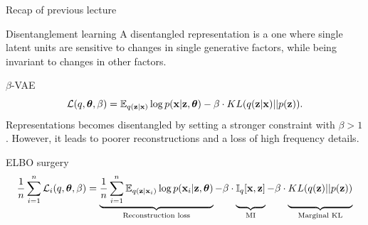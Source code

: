 \begin{frame}{Recap of previous lecture}
	\begin{block}{Disentanglement learning}
	A disentangled representation is a one where single latent units are sensitive to changes in single generative factors, while being invariant to changes in other factors. 
	\end{block}
	\begin{block}{$\beta$-VAE}
	\vspace{-0.2cm}
	\[
	    \mathcal{L}(q, \boldsymbol{\theta}, \beta) = \mathbb{E}_{q(\mathbf{z} | \mathbf{x})} \log p(\mathbf{x} | \mathbf{z}, \boldsymbol{\theta}) - \beta \cdot KL (q(\mathbf{z} | \mathbf{x}) || p(\mathbf{z})).
	\]
	Representations becomes disentangled by setting a stronger constraint with $\beta > 1$. However, it leads to poorer reconstructions and a loss of high frequency details. 
	\end{block}
	
	\begin{block}{ELBO surgery}
		\vspace{-0.3cm}
		{\footnotesize
			\[
			\frac{1}{n} \sum_{i=1}^n \cL_i(q, \btheta, \beta) = \underbrace{\frac{1}{n} \sum_{i=1}^n \mathbb{E}_{q(\bz | \bx_i)} \log p(\bx_i | \bz, \btheta)}_{\text{Reconstruction loss}} - \beta \cdot \underbrace{\bbI_{q} [\bx, \bz]\vphantom{\sum_{i=1}}}_{\text{MI}} - \beta \cdot \underbrace{KL(q(\bz) || p(\bz))\vphantom{\sum_{i=1}}}_{\text{Marginal KL}}
			\]}
	\end{block}
\end{frame}
